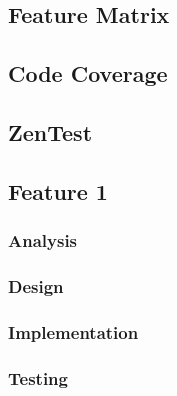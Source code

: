 \documentclass{report}
\begin{document}
\subsection{Feature Matrix}
\subsection{Code Coverage}
\subsection{ZenTest}
\subsection{Feature 1}
\subsubsection{Analysis}
\subsubsection{Design}
\subsubsection{Implementation}
\subsubsection{Testing}

\appendix
\end{document}
